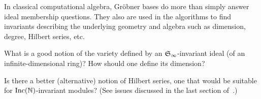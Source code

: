 

In classical computational algebra, Gr\"obner bases do more than simply answer ideal membership questions.  They also are used in the algorithms to find invariants describing the underlying geometry and algebra such as dimension, degree, Hilbert series, etc.  

\begin{question}
What is a good notion of the variety defined by an $\mathfrak S_\infty$-invariant ideal (of an infinite-dimensional ring)? How should one define its dimension? 
\end{question}

\begin{question}
Is there a better (alternative) notion of Hilbert series, one that would be suitable for $\operatorname{Inc}(\mathbb N)$-invariant modules? 
(See issues discussed in the last section of~\cite{krone2016hilbert}.) 
\end{question}



